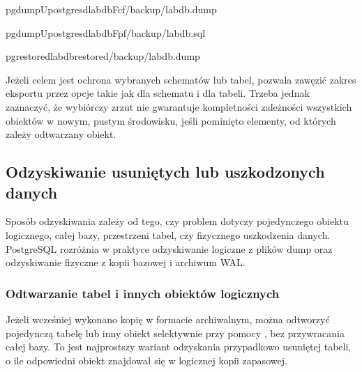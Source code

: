 \documentclass[a4paper,11pt,english,openany,oneside]{sphinxmanual}
\begin{document}
\begin{sphinxVerbatim}[commandchars=\\\{\}]
pg\PYGZus{}dump\PYGZhy{}Upostgres\PYGZhy{}dlabdb\PYGZhy{}Fc\PYGZhy{}f/backup/labdb.dump

pg\PYGZus{}dump\PYGZhy{}Upostgres\PYGZhy{}dlabdb\PYGZhy{}Fp\PYGZhy{}f/backup/labdb.sql

pg\PYGZus{}restore\PYGZhy{}dlabdb\PYGZus{}restored/backup/labdb.dump
\end{sphinxVerbatim}

\sphinxAtStartPar
Jeżeli celem jest ochrona wybranych schematów lub tabel,  pozwala zawęzić zakres eksportu przez opcje takie jak  dla schematu i  dla tabeli. Trzeba jednak zaznaczyć, że wybiórczy zrzut nie gwarantuje kompletności zależności wszystkich obiektów w nowym, pustym środowisku, jeśli pominięto elementy, od których zależy odtwarzany obiekt.


\subsection{Odzyskiwanie usuniętych lub uszkodzonych danych}
\label{\detokenize{rozdzial_2/rozdzial_28/index:odzyskiwanie-usunietych-lub-uszkodzonych-danych}}
\sphinxAtStartPar
Sposób odzyskiwania zależy od tego, czy problem dotyczy pojedynczego obiektu logicznego, całej bazy, przestrzeni tabel, czy fizycznego uszkodzenia danych. PostgreSQL rozróżnia w praktyce odzyskiwanie logiczne z plików dump oraz odzyskiwanie fizyczne z kopii bazowej i archiwum WAL.


\subsubsection{Odtwarzanie tabel i innych obiektów logicznych}
\label{\detokenize{rozdzial_2/rozdzial_28/index:odtwarzanie-tabel-i-innych-obiektow-logicznych}}
\sphinxAtStartPar
Jeżeli wcześniej wykonano kopię  w formacie archiwalnym, można odtworzyć pojedynczą tabelę lub inny obiekt selektywnie przy pomocy , bez przywracania całej bazy. To jest najprostszy wariant odzyskania przypadkowo usuniętej tabeli, o ile odpowiedni obiekt znajdował się w logicznej kopii zapasowej.
\end{document}
